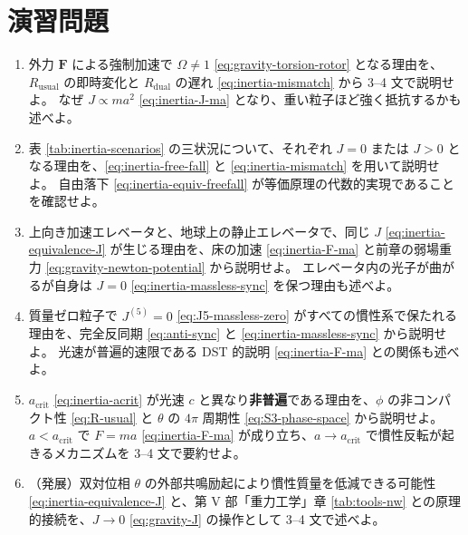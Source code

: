 \documentclass[dvipdfmx,a4paper,oneside]{jsbook}
\numberwithin{equation}{chapter}
\begin{document}
\section*{演習問題}

\begin{enumerate}[leftmargin=2em]
  \item 外力 \(\mathbf{F}\) による強制加速で \(\Omega \neq 1\) \eqref{eq:gravity-torsion-rotor} となる理由を、\(R_{\mathrm{usual}}\) の即時変化と \(R_{\mathrm{dual}}\) の遅れ \eqref{eq:inertia-mismatch} から 3--4 文で説明せよ。
  なぜ \(J \propto m a^2\) \eqref{eq:inertia-J-ma} となり、重い粒子ほど強く抵抗するかも述べよ。

  \item 表 \ref{tab:inertia-scenarios} の三状況について、それぞれ \(J = 0\) または \(J > 0\) となる理由を、\eqref{eq:inertia-free-fall} と \eqref{eq:inertia-mismatch} を用いて説明せよ。
  自由落下 \eqref{eq:inertia-equiv-freefall} が等価原理の代数的実現であることを確認せよ。

  \item 上向き加速エレベータと、地球上の静止エレベータで、同じ \(J\) \eqref{eq:inertia-equivalence-J} が生じる理由を、床の加速 \eqref{eq:inertia-F-ma} と前章の弱場重力 \eqref{eq:gravity-newton-potential} から説明せよ。
  エレベータ内の光子が曲がるが自身は \(J = 0\) \eqref{eq:inertia-massless-sync} を保つ理由も述べよ。

  \item 質量ゼロ粒子で \(J^{(5)} = 0\) \eqref{eq:J5-massless-zero} がすべての慣性系で保たれる理由を、完全反同期 \eqref{eq:anti-sync} と \eqref{eq:inertia-massless-sync} から説明せよ。
  光速が普遍的速限である DST 的説明 \eqref{eq:inertia-F-ma} との関係も述べよ。

  \item \(a_{\mathrm{crit}}\) \eqref{eq:inertia-acrit} が光速 \(c\) と異なり\textbf{非普遍}である理由を、\(\phi\) の非コンパクト性 \eqref{eq:R-usual} と \(\theta\) の \(4\pi\) 周期性 \eqref{eq:S3-phase-space} から説明せよ。
  \(a < a_{\mathrm{crit}}\) で \(F = ma\) \eqref{eq:inertia-F-ma} が成り立ち、\(a \to a_{\mathrm{crit}}\) で慣性反転が起きるメカニズムを 3--4 文で要約せよ。

  \item （発展）双対位相 \(\theta\) の外部共鳴励起により慣性質量を低減できる可能性 \eqref{eq:inertia-equivalence-J} と、第 V 部「重力工学」章 \eqref{tab:tools-nw} との原理的接続を、\(J \to 0\) \eqref{eq:gravity-J} の操作として 3--4 文で述べよ。
\end{enumerate}
\end{document}

